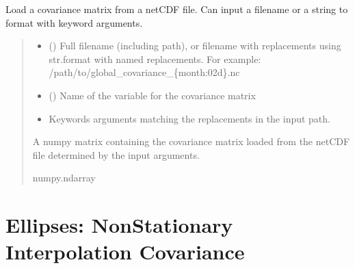 \documentclass[letterpaper,10pt,english]{sphinxmanual}
\begin{document}
\begin{fulllineitems}
\label{\detokenize{covariance:glomar_gridding.interpolation_covariance.load_covariance}}
\pysigstartsignatures
\pysiglinewithargsret
{}
{\sphinxparamcomma {}\sphinxparamcomma {}}
{}
\pysigstopsignatures
\sphinxAtStartPar
Load a covariance matrix from a netCDF file. Can input a filename or a
string to format with keyword arguments.
\begin{quote}\begin{description}
\begin{itemize}
\item {}
\sphinxAtStartPar
{} () \textendash{} Full filename (including path), or filename with replacements using
str.format with named replacements. For example:
/path/to/global\_covariance\_\{month:02d\}.nc

\item {}
\sphinxAtStartPar
{} () \textendash{} Name of the variable for the covariance matrix

\item {}
\sphinxAtStartPar
{} \textendash{} Keywords arguments matching the replacements in the input path.

\end{itemize}

\sphinxAtStartPar
{} \textendash{} A numpy matrix containing the covariance matrix loaded from the netCDF
file determined by the input arguments.

\sphinxAtStartPar
numpy.ndarray

\end{description}\end{quote}

\end{fulllineitems}


\sphinxstepscope


\chapter{Ellipses: Non\sphinxhyphen{}Stationary Interpolation Covariance}
\label{\detokenize{ellipse:ellipses-non-stationary-interpolation-covariance}}\label{\detokenize{ellipse::doc}}
\end{document}
